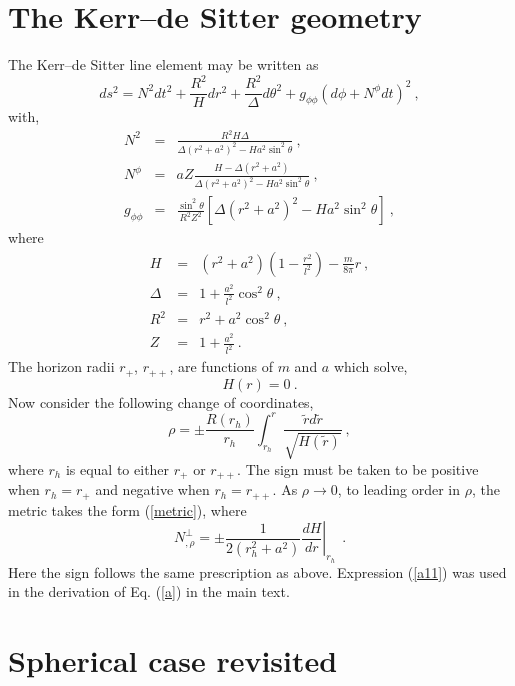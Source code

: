 \documentclass[a4paper,preprintnumbers,amsmath,amssymb]{revtex4}
\begin{document}
\appendix
\section{The Kerr--de Sitter geometry}
\label{aa}
The Kerr--de Sitter line element may be written as
\begin{equation}
\label{kds}
ds^2 = N^2 dt^2 + \frac{R^2}{H}dr^2 + \frac{R^2}{\Delta}d\theta^2
+ g_{\phi\phi}(d\phi+N^{\phi}dt)^2 \ ,
\end{equation}
with,
\begin{eqnarray}
\label{def}
N^2 &=& \frac{R^2 H \Delta}{\Delta(r^2+a^2)^2-Ha^2\sin^2\theta} \ ,  \\
N^\phi &=& a Z \frac{H-\Delta(r^2+a^2)}{\Delta(r^2+a^2)^2-Ha^2\sin^2\theta} \label{nphi}\ , \\
g_{\phi\phi} &=& \frac{\sin^2\theta}{R^2Z^2}\left[
\Delta(r^2+a^2)^2-Ha^2\sin^2\theta\right] \ ,
\end{eqnarray}
where
\begin{eqnarray}
H &=& (r^2+a^2)\left(1-\frac{r^2}{l^2}\right) - \frac{m}{8\pi} r \ , \\
\Delta &=& 1+\frac{a^2}{l^2}\cos^2\theta \ , \\
R^2 &=& r^2 + a^2\cos^2\theta \ , \\
Z &=& 1+\frac{a^2}{l^2} \ .
\end{eqnarray}
The horizon radii $r_+$, $r_{++}$, are functions of $m$ and $a$ which solve,
\begin{equation}
H(r) = 0 \ .
\label{hor}
\end{equation}
Now consider the following change of coordinates,
\begin{equation}
\rho = \pm\frac{R(r_h)}{r_h}\int_{r_h}^{r}\frac{\tilde{r}d\tilde{r}}{\sqrt{H(\tilde{r})}} \ ,
\label{change}
\end{equation}
where $r_h$ is equal to either $r_+$ or $r_{++}$. The sign must be taken
to be positive when $r_h=r_+$ and negative when $r_h=r_{++}$.
As $\rho\rightarrow 0$, to leading order in
$\rho$, the metric takes the form (\ref{metric}), where
\begin{equation}
N^{\perp}_{,\rho} = \pm\frac{1}{2(r_h^2+a^2)} \left.\frac{dH}{dr}\right|_{r_h} \ \ .
\label{a11}
\end{equation}
Here the sign follows the same prescription as above.
Expression (\ref{a11}) was used in the derivation of Eq. (\ref{a}) in the main  text.

\section{Spherical case revisited}
\end{document}
